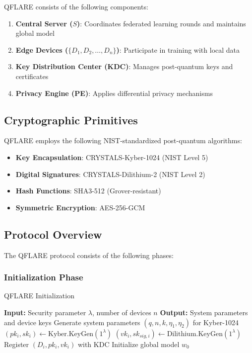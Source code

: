 \documentclass[journal,onecolumn,draftclsnofoot]{IEEEtran}
\begin{document}
QFLARE consists of the following components:

\begin{enumerate}
\item \textbf{Central Server ($S$)}: Coordinates federated learning rounds and maintains global model
\item \textbf{Edge Devices ($\{D_1, D_2, \ldots, D_n\}$)}: Participate in training with local data
\item \textbf{Key Distribution Center (KDC)}: Manages post-quantum keys and certificates
\item \textbf{Privacy Engine (PE)}: Applies differential privacy mechanisms
\end{enumerate}

\subsection{Cryptographic Primitives}

QFLARE employs the following NIST-standardized post-quantum algorithms:

\begin{itemize}
\item \textbf{Key Encapsulation}: CRYSTALS-Kyber-1024 (NIST Level 5)
\item \textbf{Digital Signatures}: CRYSTALS-Dilithium-2 (NIST Level 2)  
\item \textbf{Hash Functions}: SHA3-512 (Grover-resistant)
\item \textbf{Symmetric Encryption}: AES-256-GCM
\end{itemize}

\subsection{Protocol Overview}

The QFLARE protocol consists of the following phases:

\subsubsection{Initialization Phase}
\begin{algorithm}
\caption{QFLARE Initialization}
\begin{algorithmic}[1]
\STATE \textbf{Input:} Security parameter $\lambda$, number of devices $n$
\STATE \textbf{Output:} System parameters and device keys
\STATE Generate system parameters $(q, n, k, \eta_1, \eta_2)$ for Kyber-1024
    \STATE $(pk_i, sk_i) \leftarrow \text{Kyber.KeyGen}(1^\lambda)$
    \STATE $(vk_i, sk_{sig,i}) \leftarrow \text{Dilithium.KeyGen}(1^\lambda)$
    \STATE Register $(D_i, pk_i, vk_i)$ with KDC
\ENDFOR
\STATE Initialize global model $w_0$
\end{algorithmic}
\end{algorithm}
\end{document}
